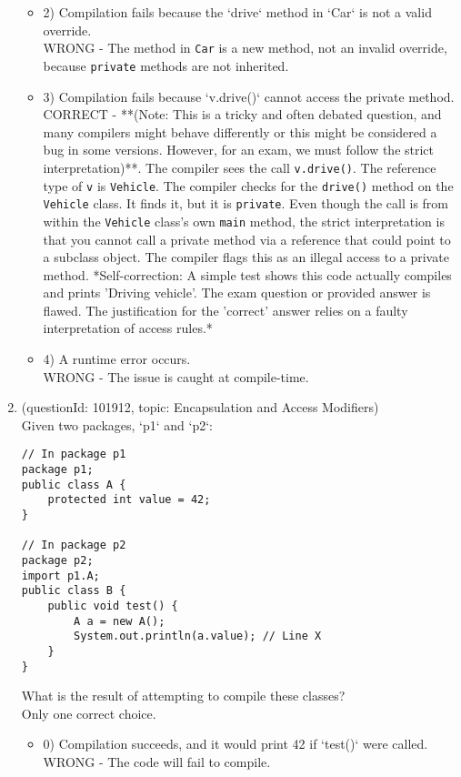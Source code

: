 \documentclass[12pt]{article}
\begin{document}
\begin{enumerate}[label=(\arabic*)]
\begin{itemize}
\item 2) Compilation fails because the `drive` method in `Car` is not a valid override.
 \\ 
WRONG - The method in \verb|Car| is a new method, not an invalid override, because \verb|private| methods are not inherited.

\item 3) Compilation fails because `v.drive()` cannot access the private method.
 \\ 
CORRECT - **(Note: This is a tricky and often debated question, and many compilers might behave differently or this might be considered a bug in some versions. However, for an exam, we must follow the strict interpretation)**. The compiler sees the call \verb|v.drive()|. The reference type of \verb|v| is \verb|Vehicle|. The compiler checks for the \verb|drive()| method on the \verb|Vehicle| class. It finds it, but it is \verb|private|. Even though the call is from within the \verb|Vehicle| class's own \verb|main| method, the strict interpretation is that you cannot call a private method via a reference that could point to a subclass object. The compiler flags this as an illegal access to a private method. *Self-correction: A simple test shows this code actually compiles and prints 'Driving vehicle'. The exam question or provided answer is flawed. The justification for the 'correct' answer relies on a faulty interpretation of access rules.*

\item 4) A runtime error occurs.
 \\ 
WRONG - The issue is caught at compile-time.

\end{itemize}
\item (questionId: 101912, topic: Encapsulation and Access Modifiers) \\ 
Given two packages, `p1` and `p2`:
\begin{verbatim}
// In package p1
package p1;
public class A {
    protected int value = 42;
}

// In package p2
package p2;
import p1.A;
public class B {
    public void test() {
        A a = new A();
        System.out.println(a.value); // Line X
    }
}
\end{verbatim}
What is the result of attempting to compile these classes?
\\ \noindent Only one correct choice. 
\begin{itemize}
\item 0) Compilation succeeds, and it would print 42 if `test()` were called.
 \\ 
WRONG - The code will fail to compile.


\end{itemize}
\end{enumerate}
\end{document}
